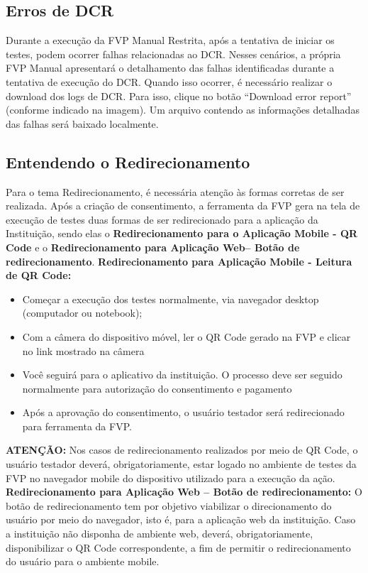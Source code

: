 \subsection{Erros de DCR}

Durante a execução da FVP Manual Restrita, após a tentativa de iniciar os testes, podem ocorrer falhas relacionadas ao DCR. Nesses cenários, a própria FVP Manual apresentará o detalhamento das falhas identificadas durante a tentativa de execução do DCR.
\medskip
Quando isso ocorrer, é necessário realizar o download dos logs de DCR. Para isso, clique no botão “Download error report” (conforme indicado na imagem). Um arquivo contendo as informações detalhadas das falhas será baixado localmente.
\begin{figure}[H]
    \centering
    \label{fig:errodcr}
\end{figure}

\subsection{Entendendo o Redirecionamento}
Para o tema Redirecionamento, é necessária atenção às formas corretas de ser realizada. Após a criação de consentimento, a ferramenta da FVP gera na tela de execução de testes duas formas de ser redirecionado para a aplicação da Instituição, sendo elas o \textbf{Redirecionamento para o Aplicação Mobile - QR Code} e o \textbf{Redirecionamento para Aplicação Web– Botão de redirecionamento}.
\medskip
\textbf{Redirecionamento para Aplicação Mobile - Leitura de QR Code:}
\begin{itemize}
    \item Começar a execução dos testes normalmente, via navegador desktop (computador ou notebook); 
    \item Com a câmera do dispositivo móvel, ler o QR Code gerado na FVP e clicar no link mostrado na câmera 
    \begin{figure}[H]
    \centering
    \label{fig:qrcode}
    \end{figure}

    \item Você seguirá para o aplicativo da instituição. O processo deve ser seguido normalmente para autorização do consentimento e pagamento 
    \item Após a aprovação do consentimento, o usuário testador será redirecionado para ferramenta da FVP. 
\end{itemize}
\medskip
\textbf{ATENÇÃO:} Nos casos de redirecionamento realizados por meio de QR Code, o usuário testador deverá, obrigatoriamente, estar logado no ambiente de testes da FVP no navegador mobile do dispositivo utilizado para a execução da ação.
\medskip
\textbf{Redirecionamento para Aplicação Web – Botão de redirecionamento:}
\medskip
O botão de redirecionamento tem por objetivo viabilizar o direcionamento do usuário por meio do navegador, isto é, para a aplicação web da instituição. Caso a instituição não disponha de ambiente web, deverá, obrigatoriamente, disponibilizar o QR Code correspondente, a fim de permitir o redirecionamento do usuário para o ambiente mobile.

